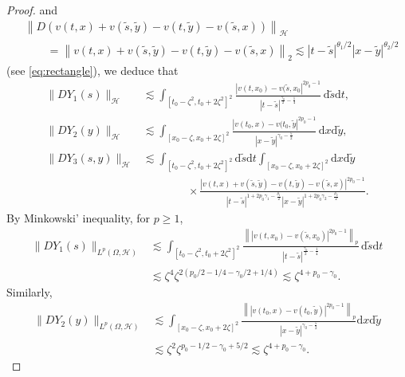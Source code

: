 \documentclass[12pt,a4paper]{article}
\renewcommand{\d}{\mathrm{d}}
\newcommand {\deltah}{{\zeta}}
\newcommand{\<}{\langle}
\renewcommand{\>}{\rangle}
\begin{document}
\begin{proof}
and
           \begin{align}\label{eq:rect2}
           &\left\|D\left(v(t,x)+v(\tilde{s},\tilde{y})-v(t,\tilde{y})-v(\tilde{s},x)\right)  \right\|_{\mathcal{H}}\nonumber\\
           &\qquad=\left\|v(t,x)+v(\tilde{s},\tilde{y})-v(t,\tilde{y})-v(\tilde{s},x) \right\|_{2}
            \lesssim |t-\tilde{s}|^{\theta_1/2}|x-\tilde{y}|^{\theta_2/2}
           \end{align}
           (see \eqref{eq:rectangle}),
we deduce that 
           \begin{align*}
           \|DY_1(s)\|_{\mathcal{H}} &\lesssim \int_{[t_0-\deltah^2, t_0+2\deltah^2]^2} \frac {|v(t,x_0)-v(\tilde{s},x_0|^{2p_0-1}
           }{|t-\tilde{s}|^{\frac{\gamma_0}{2}-\frac14}}\,  \d \tilde{s} \d t,\\
           \|DY_2(y)\|_{\mathcal{H}}&\lesssim \int_{[x_0-\deltah, x_0+2\deltah]^2} \frac {|v(t_0,x)-v(t_0,\tilde{y}|^{2p_0-1}}{|x-\tilde{y}|^{\gamma_0-\frac52} } \, \d x\d \tilde{y},\\
            \|DY_3(s,y)\|_{\mathcal{H}}&\lesssim \int_{[t_0-\deltah^2, t_0+2\deltah^2]^2}\d \tilde{s}\d t \int_{[x_0-\deltah, x_0+2\deltah]^2} \d x\d \tilde{y} 
            \\
            &\qquad\qquad \times \frac {|v(t,x)+v(\tilde{s},\tilde{y})-v(t,\tilde{y})-v(\tilde{s},x)|^{2p_0-1}
            }{|t-\tilde{s}|^{1+2p_0\gamma_1 -\frac{\theta_1}{2}}|x-\tilde{y}|^{1+2p_0\gamma_2-\frac{\theta_2}{2}}}.
           \end{align*}
           By Minkowski' inequality, for $p\geq 1$,
           \begin{align}\label{eq:Y1}
           \|DY_1(s)\|_{L^p(\Omega, \mathcal{H})} &\lesssim  \int_{[t_0-\deltah^2, t_0+2\deltah^2]^2} \frac {\left\||v(t,x_0)-v(\tilde{s},x_0)|^{2p_0-1}\right\|_{p}
           }{|t-\tilde{s}|^{\frac{\gamma_0}{2}-\frac14}}\, \d \tilde{s} \d t \nonumber\\
           &\lesssim \zeta^4 \zeta^{2(p_0/2 - 1/4 - \gamma_0/2 + 1/4)} \lesssim \deltah^{4+p_0-\gamma_0}.
           \end{align}
            Similarly, 
           \begin{align}\label{eq:Y2}
           \|DY_2(y)\|_{L^p(\Omega, \mathcal{H})} &\lesssim 
           \int_{[x_0-\deltah, x_0+2\deltah]^2} \frac {\left\||v(t_0,x)-v(t_0,\tilde{y})|^{2p_0-1}\right\|_{p}}{|x-\tilde{y}|^{\gamma_0-\frac52} }\d x\d \tilde{y}\nonumber\\
           &\lesssim \zeta^2 \zeta^{p_0 - 1/2 - \gamma_0 + 5/2} \lesssim \deltah^{4+p_0-\gamma_0}.

\end{align}
\end{proof}
\end{document}
